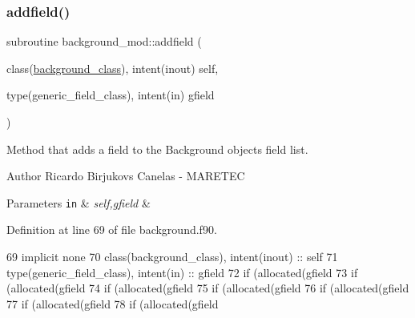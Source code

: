 \subsubsection{\texorpdfstring{addfield()}{addfield()}}
{\footnotesize\ttfamily subroutine background\+\_\+mod\+::addfield (\begin{DoxyParamCaption}\item[{class(\mbox{\hyperlink{structbackground__mod_1_1background__class}{background\+\_\+class}}), intent(inout)}]{self,  }\item[{type(generic\+\_\+field\+\_\+class), intent(in)}]{gfield }\end{DoxyParamCaption})\hspace{0.3cm}{\ttfamily [private]}}



Method that adds a field to the Background object\textquotesingle{}s field list. 

\begin{DoxyAuthor}{Author}
Ricardo Birjukovs Canelas -\/ M\+A\+R\+E\+T\+EC 
\end{DoxyAuthor}

\begin{DoxyParams}[1]{Parameters}
\mbox{\tt in}  & {\em self,gfield} & \\
\hline
\end{DoxyParams}


Definition at line 69 of file background.\+f90.


\begin{DoxyCode}
69     \textcolor{keywordtype}{implicit none}
70     \textcolor{keywordtype}{class}(background\_class), \textcolor{keywordtype}{intent(inout)} :: self
71     \textcolor{keywordtype}{type}(generic\_field\_class), \textcolor{keywordtype}{intent(in)} :: gfield
72     \textcolor{keywordflow}{if} (\textcolor{keyword}{allocated}(gfield%
73     \textcolor{keywordflow}{if} (\textcolor{keyword}{allocated}(gfield%
74     \textcolor{keywordflow}{if} (\textcolor{keyword}{allocated}(gfield%
75     \textcolor{keywordflow}{if} (\textcolor{keyword}{allocated}(gfield%
76     \textcolor{keywordflow}{if} (\textcolor{keyword}{allocated}(gfield%
77     \textcolor{keywordflow}{if} (\textcolor{keyword}{allocated}(gfield%
78     \textcolor{keywordflow}{if} (\textcolor{keyword}{allocated}(gfield%
\end{DoxyCode}
\mbox{\label{namespacebackground__mod_ad0096fb6a5a11854fd70a7ce58dc3000}} 
